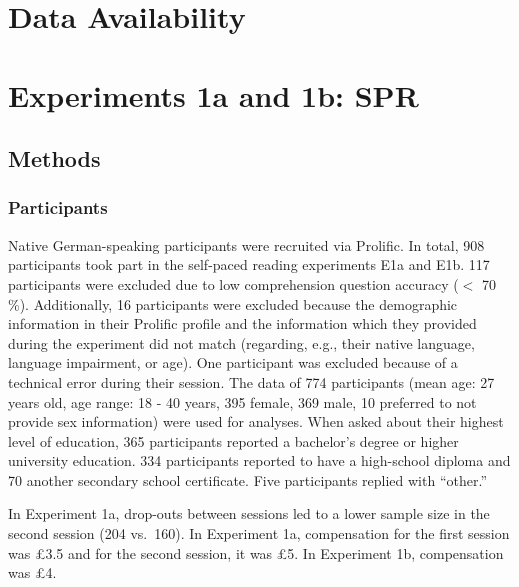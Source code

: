 \documentclass[review,preprint,12pt,authoryear,floatsintext]{elsarticle}
\begin{document}
\section*{Data Availability}


\section*{Experiments 1a and 1b: SPR}

\subsection*{Methods}
\subsubsection*{Participants}

Native German-speaking participants were recruited via Prolific. In total, 908 participants took part in the self-paced reading experiments E1a and E1b. 117 participants were excluded due to low comprehension question accuracy ($<$ 70\,\%). Additionally, 16 participants were excluded because the demographic information in their Prolific profile and the information which they provided during the experiment did not match (regarding, e.g., their native language, language impairment, or age). One participant was excluded because of a technical error during their session. The data of 774 participants (mean age: 27 years old, age range: 18 - 40 years, 395 female, 369 male, 10 preferred to not provide sex information) were used for analyses. When asked about their highest level of education, 365 participants reported a bachelor's degree or higher university education. 334 participants reported to have a high-school diploma and 70 another secondary school certificate. Five participants replied with ``other.'' 

In Experiment 1a, drop-outs between sessions led to a lower sample size in the second session (204 vs.\ 160). In Experiment 1a, compensation for the first session was \pounds 3.5 and for the second session, it was \pounds 5. In Experiment 1b, compensation was \pounds 4. 
\end{document}
